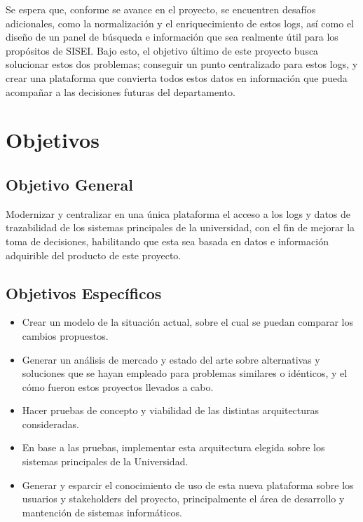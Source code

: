 Se espera que, conforme se avance en el proyecto, se encuentren desafíos adicionales, como la normalización y el enriquecimiento de estos logs, así como el diseño de un panel de búsqueda e información que sea realmente útil para los propósitos de SISEI. Bajo esto, el objetivo último de este proyecto busca solucionar estos dos problemas; conseguir un punto centralizado para estos logs, y crear una plataforma que convierta todos estos datos en información que pueda acompañar a las decisiones futuras del departamento.

\clearpage

\section{Objetivos}
\subsection{Objetivo General}

Modernizar y centralizar en una única plataforma el acceso a los logs y datos de trazabilidad de los sistemas principales de la universidad, con el fin de mejorar la toma de decisiones, habilitando que esta sea basada en datos e información adquirible del producto de este proyecto.

\subsection{Objetivos Específicos}

\begin{itemize}
	\item Crear un modelo de la situación actual, sobre el cual se puedan comparar los cambios propuestos.
	\item Generar un análisis de mercado y estado del arte sobre alternativas y soluciones que se hayan empleado para problemas similares o idénticos, y el cómo fueron estos proyectos llevados a cabo.
	\item Hacer pruebas de concepto y viabilidad de las distintas arquitecturas consideradas.
	\item En base a las pruebas, implementar esta arquitectura elegida sobre los sistemas principales de la Universidad.
	\item Generar y esparcir el conocimiento de uso de esta nueva plataforma sobre los usuarios y stakeholders del proyecto, principalmente el área de desarrollo y mantención de sistemas informáticos.
\end{itemize}

